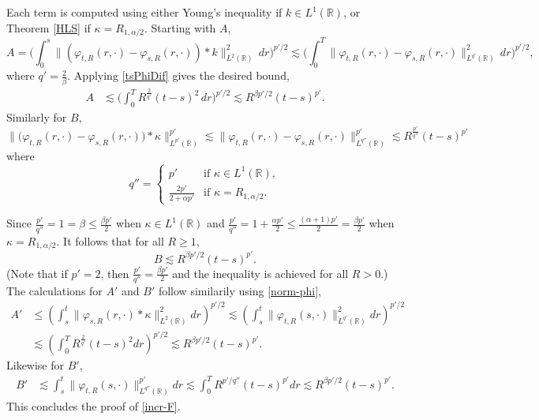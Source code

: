 \documentclass[12pt]{article}
\def\bR{\mathbb{R}}
\newcommand{\les}{\lesssim}
\def\k{\kappa}
\begin{document}
Each term is computed using either Young's inequality if $k \in L^1(\bR)$, or Theorem \ref{HLS} if $\k = R_{1,\alpha/2}$. Starting with $A$,  
\[
A = \Bigg( \int_0^s  \| (\varphi_{t,R}(r,\cdot)-\varphi_{s,R}(r,\cdot))*k\|_{L^2(\bR)}^2  \, dr\Bigg)^{p'/2} \les \Bigg( \int_0^T  \| \varphi_{t,R}(r,\cdot)-\varphi_{s,R}(r,\cdot)\|_{L^{q'}(\bR)}^2  \, dr\Bigg)^{p'/2},
\]
where $q' = \frac{2}{\beta}$. Applying \eqref{tsPhiDif} gives the desired bound, 
\begin{align*}
A & \les \Bigg( \int_0^T  R^{\frac{2}{q'}}(t-s)^2  \, dr\Bigg)^{p'/2}  \les R^{\beta p'/2}(t-s)^{p'}.
\end{align*}
Similarly for $B$,
\[
\big\|\big(\varphi_{t,R}(r,\cdot)-\varphi_{s,R}(r,\cdot)\big) * \k\big\|_{L^{p'}(\bR)}^{p'} \les \|\varphi_{t,R}(r,\cdot)-\varphi_{s,R}(r,\cdot)\|_{L^{q''}(\bR)}^{p'} \les R^{\frac{p'}{q''}} (t-s)^{p'}
\]
where
\[
q'' = 
\begin{cases}
p' & \text{if } \k \in L^1(\bR), \\
\frac{2p'}{2 + \alpha p'} & \text{if } \k = R_{1,\alpha/2}.
\end{cases}
\]


Since $\frac{p'}{q''} = 1 = \beta \leq \frac{\beta p'}{2}$ when $\k \in L^1(\bR)$ and  $\frac{p'}{q''}=1+\frac{\alpha p'}{2} \leq \frac{(\alpha+1)p'}{2}= \frac{\beta p'}{2}$ when $\k = R_{1,\alpha/2}$. It follows that for all $R\geq 1$,
\[
B \les R^{\beta p' / 2} (t-s)^{p'}.
\]
(Note that if $p' = 2$, then $\frac{p'}{q''} = \frac{\beta p'}{2}$ and the inequality is achieved for all $R > 0$.) The calculations for $A'$ and $B'$ follow similarily using \eqref{norm-phi},
\begin{align*}
A' & \leq \left( \int_s^t \| \varphi_{s,R}(r,\cdot)* \k \|^2_{L^2(\bR)} dr \right)^{p'/2} \les \left( \int_s^t \| \varphi_{t,R}(s,\cdot) \|_{L^{q'}(\bR)}^2 dr \right)^{p'/2}
\\
& \les \left( \int_0^T R^{\frac{2}{q'}} (t-s)^{2} dr \right)^{p'/2} \les R^{\beta p'/2} (t-s)^{p'}.
\end{align*}
Likewise for $B'$,
\begin{align*}
B' & \les \int_s^t \big\|\varphi_{t,R}(s,\cdot)\|_{L^{q''}(\bR)}^{p'}   dr \les
  \int_0^T R^{p'/q''} (t-s)^{p'} dr \les R^{\beta p'/2} (t-s)^{p'}.
\end{align*}
This concludes the proof of \eqref{incr-F}.

\vspace{30mm}

\appendix
\end{document}
